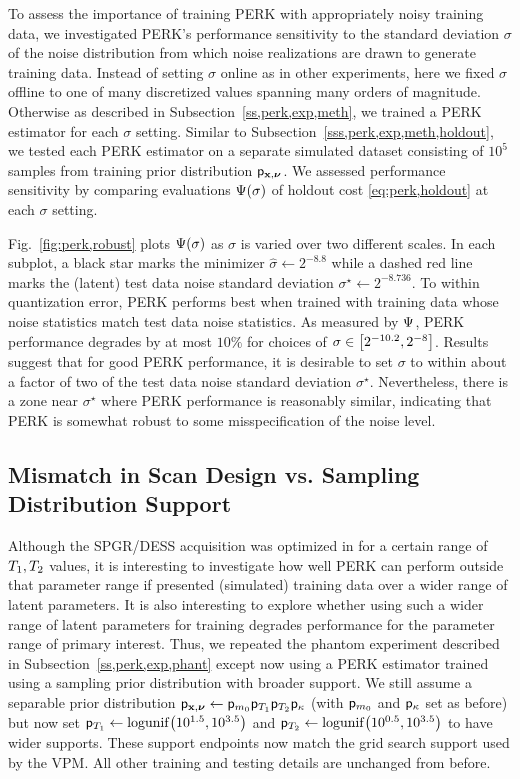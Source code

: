 To assess the importance
of training PERK
with appropriately noisy training data,
we investigated PERK's performance sensitivity
to the standard deviation $\sigma$
of the noise distribution 
from which noise realizations are drawn
to generate training data.
Instead of setting $\sigma$ online
as in other experiments,
here we fixed $\sigma$ offline
to one of many discretized values
spanning many orders of magnitude.
Otherwise as described 
in Subsection~\ref{ss,perk,exp,meth},
we trained a PERK estimator
for each $\sigma$ setting.
Similar to Subsection~\ref{sss,perk,exp,meth,holdout},
we tested each PERK estimator 
on a separate simulated dataset
consisting of $10^5$ samples 
from training prior distribution $\mathsf{p}_{\mathbf{x},\boldsymbol{\nu}}$.
We assessed performance sensitivity
by comparing evaluations $\costa{\sigma}$ 
of holdout cost \eqref{eq:perk,holdout}
at each $\sigma$ setting.
	
Fig.~\ref{fig:perk,robust} plots $\costa{\sigma}$
as $\sigma$ is varied 
over two different scales.
In each subplot,
a black star marks the minimizer 
$\hat{\sigma} \gets 2^{-8.8}$
while a dashed red line marks
the (latent) test data noise standard deviation 
$\sigma^\star \gets 2^{-8.736}$.
To within quantization error,
PERK performs best 
when trained with training data
whose noise statistics 
match test data noise statistics.
As measured by $\Psi$, 
PERK performance degrades by at most $10\%$ 
for choices of $\sigma \in \brac{2^{-10.2},2^{-8}}$.
Results suggest
that for good PERK performance,
it is desirable
to set $\sigma$
to within about a factor of two
of the test data noise standard deviation $\sigma^\star$.
Nevertheless,
there is a zone near $\sigma^\star$
where PERK performance is reasonably similar,
indicating that PERK is somewhat robust
to some misspecification of the noise level.

\subsection{Mismatch in Scan Design vs. Sampling Distribution Support}
\label{ss,perk,robust,dist}

Although the SPGR/DESS acquisition
was optimized in \cite{nataraj:17:oms}
for a certain range of $T_1,T_2$ values,
it is interesting to investigate
how well PERK can perform 
outside that parameter range
if presented (simulated) training data
over a wider range of latent parameters.
It is also interesting to explore
whether using such a wider range 
of latent parameters for training
degrades performance
for the parameter range 
of primary interest.
Thus, 
we repeated the phantom experiment
described in Subsection~\ref{ss,perk,exp,phant}
except now using a PERK estimator
trained using a sampling prior distribution
with broader support.
We still assume a separable prior distribution
$\mathsf{p}_{\mathbf{x},\boldsymbol{\nu}} \gets \mathsf{p}_{m_0}\mathsf{p}_{T_1}\mathsf{p}_{T_2}\mathsf{p}_{\kappa}$ 
(with $\mathsf{p}_{m_0}$ and $\mathsf{p}_{\kappa}$ set as before)
but now set 
$\dist{\To} \gets \logunif{10^{1.5}, 10^{3.5}}$ 
and 
$\dist{\Tt} \gets \logunif{10^{0.5}, 10^{3.5}}$ 
to have wider supports.
These support endpoints 
now match the grid search support
used by the VPM.
All other training and testing details are unchanged from before.

